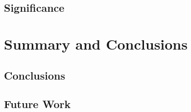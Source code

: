 \section{Significance}


\chapter{Summary and Conclusions}

\section{Conclusions}

\section{Future Work}

























